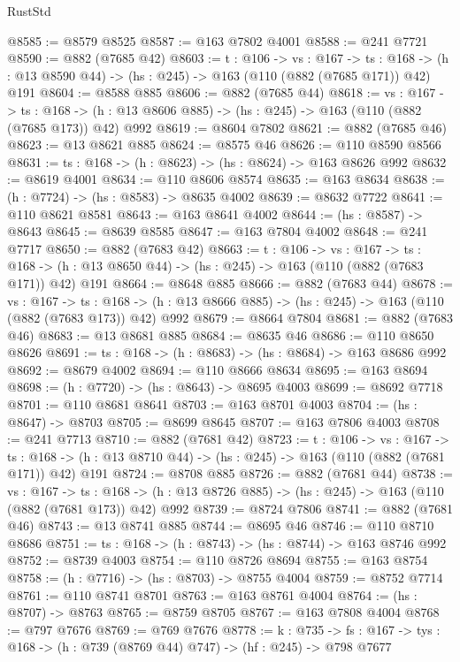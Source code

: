 \begin{lexlean}{RustStd}
\begin{coremodule}
@8585 := @8579 @8525
@8587 := @163 @7802 @4001
@8588 := @241 @7721
@8590 := @882 (@7685 @42)
@8603 := {t : @106} ->
  {vs : @167} ->
  {ts : @168} -> (h : @13 @8590 @44) -> (hs : @245) -> @163 (@110 (@882 (@7685 @171)) @42) @191
@8604 := @8588 @885
@8606 := @882 (@7685 @44)
@8618 := {vs : @167} ->
  {ts : @168} -> (h : @13 @8606 @885) -> (hs : @245) -> @163 (@110 (@882 (@7685 @173)) @42) @992
@8619 := @8604 @7802
@8621 := @882 (@7685 @46)
@8623 := @13 @8621 @885
@8624 := @8575 @46
@8626 := @110 @8590 @8566
@8631 := {ts : @168} -> (h : @8623) -> (hs : @8624) -> @163 @8626 @992
@8632 := @8619 @4001
@8634 := @110 @8606 @8574
@8635 := @163 @8634
@8638 := (h : @7724) -> (hs : @8583) -> @8635 @4002
@8639 := @8632 @7722
@8641 := @110 @8621 @8581
@8643 := @163 @8641 @4002
@8644 := (hs : @8587) -> @8643
@8645 := @8639 @8585
@8647 := @163 @7804 @4002
@8648 := @241 @7717
@8650 := @882 (@7683 @42)
@8663 := {t : @106} ->
  {vs : @167} ->
  {ts : @168} -> (h : @13 @8650 @44) -> (hs : @245) -> @163 (@110 (@882 (@7683 @171)) @42) @191
@8664 := @8648 @885
@8666 := @882 (@7683 @44)
@8678 := {vs : @167} ->
  {ts : @168} -> (h : @13 @8666 @885) -> (hs : @245) -> @163 (@110 (@882 (@7683 @173)) @42) @992
@8679 := @8664 @7804
@8681 := @882 (@7683 @46)
@8683 := @13 @8681 @885
@8684 := @8635 @46
@8686 := @110 @8650 @8626
@8691 := {ts : @168} -> (h : @8683) -> (hs : @8684) -> @163 @8686 @992
@8692 := @8679 @4002
@8694 := @110 @8666 @8634
@8695 := @163 @8694
@8698 := (h : @7720) -> (hs : @8643) -> @8695 @4003
@8699 := @8692 @7718
@8701 := @110 @8681 @8641
@8703 := @163 @8701 @4003
@8704 := (hs : @8647) -> @8703
@8705 := @8699 @8645
@8707 := @163 @7806 @4003
@8708 := @241 @7713
@8710 := @882 (@7681 @42)
@8723 := {t : @106} ->
  {vs : @167} ->
  {ts : @168} -> (h : @13 @8710 @44) -> (hs : @245) -> @163 (@110 (@882 (@7681 @171)) @42) @191
@8724 := @8708 @885
@8726 := @882 (@7681 @44)
@8738 := {vs : @167} ->
  {ts : @168} -> (h : @13 @8726 @885) -> (hs : @245) -> @163 (@110 (@882 (@7681 @173)) @42) @992
@8739 := @8724 @7806
@8741 := @882 (@7681 @46)
@8743 := @13 @8741 @885
@8744 := @8695 @46
@8746 := @110 @8710 @8686
@8751 := {ts : @168} -> (h : @8743) -> (hs : @8744) -> @163 @8746 @992
@8752 := @8739 @4003
@8754 := @110 @8726 @8694
@8755 := @163 @8754
@8758 := (h : @7716) -> (hs : @8703) -> @8755 @4004
@8759 := @8752 @7714
@8761 := @110 @8741 @8701
@8763 := @163 @8761 @4004
@8764 := (hs : @8707) -> @8763
@8765 := @8759 @8705
@8767 := @163 @7808 @4004
@8768 := @797 @7676
@8769 := @769 @7676
@8778 := {k : @735} ->
  {fs : @167} -> {tys : @168} -> (h : @739 (@8769 @44) @747) -> (hf : @245) -> @798 @7677

\end{coremodule}
\end{lexlean}
